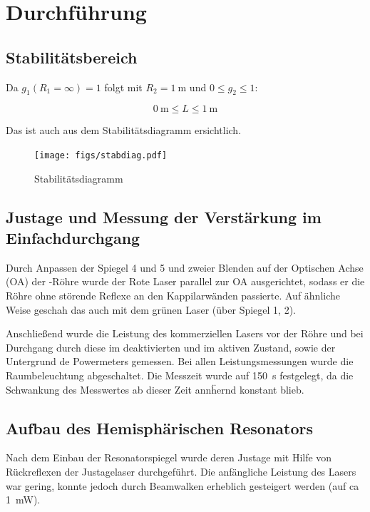 \documentclass[slug=GL, room=HZDR\ Dresden/Rossendorf\,\ Geb.\ 620/123, supervisor=Tim\ Ziegler]{../../Lab_Report_LaTeX/lab_report}
\begin{document}
\section{Durchf\"uhrung}
\label{sec:durch}

\subsection{Stabilit\"atsbereich}
\label{sec:stabber}

Da \(g_1(R_1=\infty)=1\) folgt mit \(R_2=\SI{1}{\meter}\) und \(0\leq g_2\leq 1\):

\begin{equation}
  \label{eq:stabber}
  \SI{0}{\meter}\leq L \leq \SI{1}{\meter}
\end{equation}

Das ist auch aus dem Stabilit\"atsdiagramm ersichtlich.
\begin{figure}[H]\centering
  \texttt{[image: figs/stabdiag.pdf]}
  \caption[Gauss]{Stabilit\"atsdiagramm}
  \label{fig:stabdiag}
\end{figure}

\subsection{Justage und Messung der Verst\"arkung im Einfachdurchgang}
\label{sec:justage}

Durch Anpassen der Spiegel 4 und 5 und zweier Blenden auf der
Optischen Achse (OA) der -R\"ohre wurde der Rote Laser
parallel zur OA ausgerichtet, sodass er die R\"ohre ohne st\"orende
Reflexe an den Kappilarw\"anden passierte. Auf \"ahnliche Weise
geschah das auch mit dem gr\"unen Laser (\"uber Spiegel 1, 2).

Anschlie\ss{}end wurde die Leistung des kommerziellen Lasers vor der
R\"ohre und bei Durchgang durch diese im deaktivierten und im aktiven
Zustand, sowie der Untergrund de Powermeters gemessen. Bei allen
Leistungsmessungen wurde die Raumbeleuchtung abgeschaltet. Die
Messzeit wurde auf \SI{150}{\second} festgelegt, da die Schwankung
des Messwertes ab dieser Zeit ann\"hernd konstant blieb.

\subsection{Aufbau des Hemisph\"arischen Resonators}
\label{sec:aufbauhemi}

Nach dem Einbau der Resonatorspiegel wurde deren Justage mit Hilfe von
R\"uckreflexen der Justagelaser durchgef\"uhrt. Die anf\"angliche
Leistung des Lasers war gering, konnte jedoch durch Beamwalken
erheblich gesteigert werden (auf ca \SI{1}{\milli\watt}).
\end{document}
